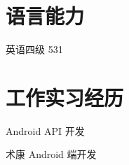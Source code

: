 \documentclass[]{deedy-resume-openfont}
\begin{document}
\begin{minipage}[t]{0.3\textwidth}
\section{语言能力}
\sectionsep
英语四级 531 \\
\sectionsep






\section{工作实习经历}

\sectionsep
{}
\vspace{\topsep}
\vspace{\topsep}
\begin{tightemize}
\item Android API 开发
\end{tightemize}
\sectionsep

\sectionsep
{}
\vspace{\topsep}
\begin{tightemize}
\item 术康 Android 端开发
\end{tightemize}
\sectionsep


\end{minipage}
\end{document}
